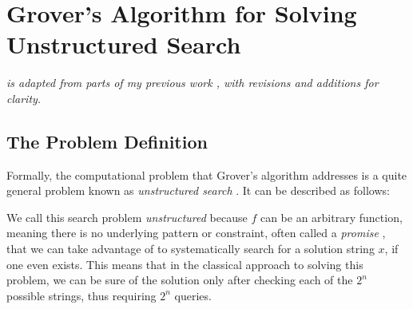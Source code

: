 \chapter{Grover's Algorithm for Solving Unstructured Search}\label{chap:grovers_explanation}
\textit{ is adapted from parts of my previous work \cite{ownwork}, with revisions and additions for clarity.}



\section{The Problem Definition}
Formally, the computational problem that Grover's algorithm addresses is a quite general problem known as \emph{unstructured search} \cite{Qiskit2023}. It can be described as follows:
\begin{center}
\end{center}
We call this search problem \emph{unstructured} because $f$ can be an arbitrary function, meaning there is no underlying pattern or constraint, often called a \emph{promise} \cite{Qiskit2023}, that we can take advantage of to systematically search for a solution string $x$, if one even exists. This means that in the classical approach to solving this problem, we can be sure of the solution only after checking each of the $2^n$ possible strings, thus requiring $2^n$ queries. 

